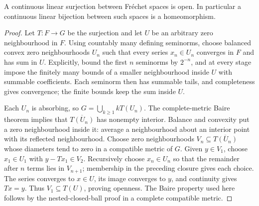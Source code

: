 \begin{cqlemma}
\label{thm:cq-ring-open-mapping}
A continuous linear surjection between Fr\'echet spaces is
open. In particular a continuous linear bijection between
such spaces is a homeomorphism.
\end{cqlemma}
\begin{proof}
Let $T:F\to G$ be the surjection and let $U$ be an arbitrary
zero neighbourhood in $F$. Using countably many defining
seminorms, choose balanced convex zero neighbourhoods $U_n$
such that every series $x_n\in U_n$ converges in $F$ and
has sum in $U$. Explicitly, bound the first $n$ seminorms
by $2^{-n}$, and at every stage impose the finitely many
bounds of a smaller neighbourhood inside $U$ with summable
coefficients. Each seminorm then has summable tails, and
completeness gives convergence; the finite bounds keep the
sum inside $U$.

Each $U_n$ is absorbing, so
$G=\bigcup_{k\geq1}kT(U_n)$. The complete-metric Baire
theorem implies that $\overline{T(U_n)}$ has nonempty
interior. Balance and convexity put a zero neighbourhood
inside it: average a neighbourhood about an interior point
with its reflected neighbourhood. Choose zero neighbourhoods
$V_n\subseteq\overline{T(U_n)}$ whose diameters tend to
zero in a compatible metric of $G$.
Given $y\in V_1$, choose $x_1\in U_1$ with
$y-Tx_1\in V_2$. Recursively choose $x_n\in U_n$ so that
the remainder after $n$ terms lies in $V_{n+1}$; membership
in the preceding closure gives each choice. The series
converges to $x\in U$, its image converges to $y$, and
continuity gives $Tx=y$. Thus $V_1\subseteq T(U)$, proving
openness. The Baire property used here follows by the
nested-closed-ball proof in a complete compatible metric.
\end{proof}

